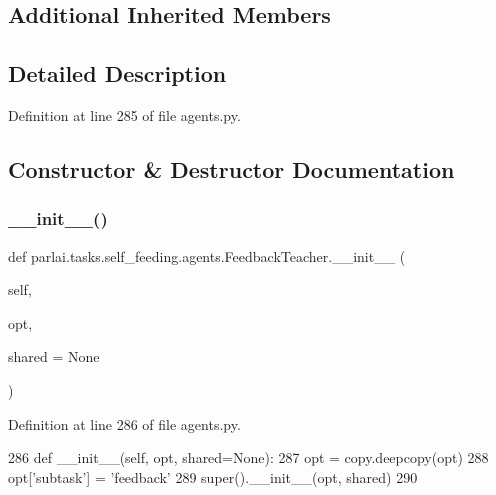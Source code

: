 \subsection*{Additional Inherited Members}


\subsection{Detailed Description}


Definition at line 285 of file agents.\+py.



\subsection{Constructor \& Destructor Documentation}
\mbox{\label{classparlai_1_1tasks_1_1self__feeding_1_1agents_1_1FeedbackTeacher_aafb96d12c0ae083d89bcf0365c2dfb6e}} 
\subsubsection{\texorpdfstring{\+\_\+\+\_\+init\+\_\+\+\_\+()}{\_\_init\_\_()}}
{\footnotesize\ttfamily def parlai.\+tasks.\+self\+\_\+feeding.\+agents.\+Feedback\+Teacher.\+\_\+\+\_\+init\+\_\+\+\_\+ (\begin{DoxyParamCaption}\item[{}]{self,  }\item[{}]{opt,  }\item[{}]{shared = {\ttfamily None} }\end{DoxyParamCaption})}



Definition at line 286 of file agents.\+py.


\begin{DoxyCode}
286     \textcolor{keyword}{def }\_\_init\_\_(self, opt, shared=None):
287         opt = copy.deepcopy(opt)
288         opt[\textcolor{stringliteral}{'subtask'}] = \textcolor{stringliteral}{'feedback'}
289         super().\_\_init\_\_(opt, shared)
290 
\end{DoxyCode}


